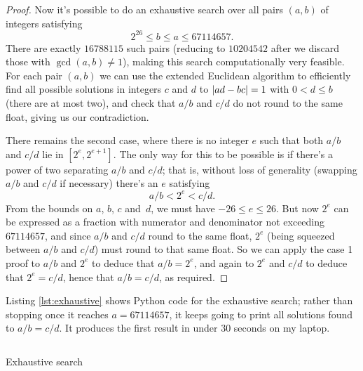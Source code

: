 \documentclass[a4paper]{article}
\DeclarePairedDelimiter\abs{\lvert}{\rvert}
\theoremstyle{plain}
\begin{document}
\begin{proof}
    Now it's possible to do an exhaustive search over all pairs $(a, b)$ of
    integers satisfying
    \[2^{26} \le b \le a \le 67114657.\] There are exactly $16788115$ such
    pairs (reducing to $10204542$ after we discard those with $\gcd(a, b) \ne
    1$), making this search computationally very feasible. For each pair $(a,
    b)$ we can use the extended Euclidean algorithm to efficiently find all
    possible solutions in integers $c$ and $d$ to $\abs{ad - bc} = 1$ with $0 <
    d \le b$ (there are at most two), and check that $a/b$ and $c/d$ do not
    round to the same float, giving us our contradiction.

    There remains the second case, where there is no integer $e$ such that
    both $a/b$ and $c/d$ lie in $[2^e, 2^{e+1}]$. The only way for this to
    be possible is if there's a power of two separating $a/b$ and $c/d$; that
    is, without loss of generality (swapping $a/b$ and $c/d$ if necessary)
    there's an $e$ satisfying
    \[a/b < 2^e < c/d.\]
    From the bounds on $a$, $b$, $c$ and~$d$, we must have
    $-26 \le e \le 26$. But now $2^e$ can be expressed as a fraction with
    numerator and denominator not exceeding $67114657$, and since $a/b$ and
    $c/d$ round to the same float, $2^e$ (being squeezed between $a/b$ and
    $c/d$) must round to that same float. So we can apply the case 1 proof to
    $a/b$ and $2^e$ to deduce that $a/b = 2^e$, and again to $2^e$ and $c/d$ to
    deduce that $2^e = c/d$, hence that $a/b = c/d$, as required.
\end{proof}

Listing \ref{lst:exhaustive} shows Python code for the exhaustive search;
rather than stopping once it reaches $a = 67114657$, it keeps going to print
all solutions found to $a/b = c/d$. It produces the first result in under 30
seconds on my laptop.

\begin{listing}
\inputminted{python}{fraction_to_float.py}
\caption{Exhaustive search}
\label{lst:exhaustive}
\end{listing}
\end{document}
